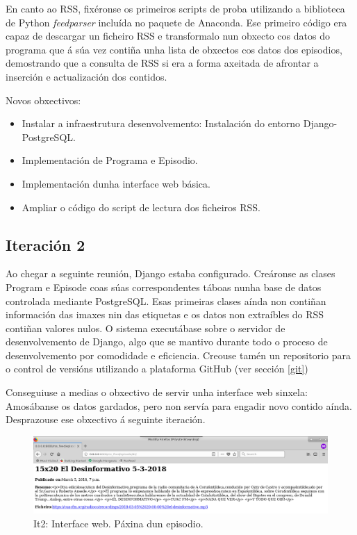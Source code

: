 En canto ao RSS, fixéronse os primeiros scripts de proba utilizando a biblioteca de Python \textit{feedparser} incluída no paquete de Anaconda. Ese primeiro código era capaz de descargar un ficheiro RSS e transformalo nun obxecto cos datos do programa que á súa vez contiña unha lista de obxectos cos datos dos episodios, demostrando que a consulta de RSS si era a forma axeitada de afrontar a inserción e actualización dos contidos.

Novos obxectivos:

\begin{itemize}
	\item Instalar a infraestrutura desenvolvemento: Instalación do entorno Django-PostgreSQL.
	\item Implementación de Programa e Episodio.
	\item Implementación dunha interface web básica.
	\item Ampliar o código do script de lectura dos ficheiros RSS.
\end{itemize}

\subsection{Iteración 2}

Ao chegar a seguinte reunión, Django estaba configurado. Creáronse as clases Program e Episode coas súas correspondentes táboas nunha base de datos controlada mediante PostgreSQL. Esas primeiras clases aínda non contiñan información das imaxes nin das etiquetas e os datos non extraíbles do RSS contiñan valores nulos. O sistema executábase sobre o servidor de desenvolvemento de Django, algo que se mantivo durante todo o proceso de desenvolvemento por comodidade e eficiencia. Creouse tamén un repositorio para o control de versións utilizando a plataforma GitHub (ver sección \ref{git})

Conseguiuse a medias o obxectivo de servir unha interface web sinxela: Amosábanse os datos gardados, pero non servía para engadir novo contido aínda. Desprazouse ese obxectivo á seguinte iteración.

\begin{figure}[h]
	\centering
	\includegraphics[scale=0.3,keepaspectratio=true]{./images/it2_episode.png}
	\caption{It2: Interface web. Páxina dun episodio.}
	\label{fig:it2_episode}
\end{figure}

